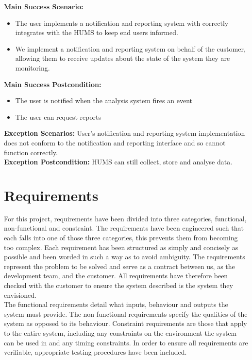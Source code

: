 \documentclass[10pt,a4paper]{article}
\begin{document}
\textbf{Main Success Scenario:}
\begin{itemize}
\item The user implements a notification and reporting system with correctly integrates with the HUMS to keep end users informed.
\item We implement a notification and reporting system on behalf of the customer, allowing them to receive updates about the state of the system they are monitoring.
\end{itemize}
\textbf{Main Success Postcondition:}
\begin{itemize}
\item The user is notified when the analysis system fires an event
\item The user can request reports
\end{itemize}
\textbf{Exception Scenarios:} User's notification and reporting system implementation does not conform to the notification and reporting interface and so cannot function correctly.\\
\textbf{Exception Postcondition:} HUMS can still collect, store and analyse data.

\section{Requirements}
For this project, requirements have been divided into three categories, functional, non-functional and constraint. The requirements have been engineered such that each falls into one of those three categories, this prevents them from becoming too complex. Each requirement has been structured as simply and concisely as possible and been worded in such a way as to avoid ambiguity. The requirements represent the problem to be solved and serve as a contract between us, as the development team, and the customer. All requirements have therefore been checked with the customer to ensure the system described is the system they envisioned.\\
The functional requirements detail what inputs, behaviour and outputs the system must provide. The non-functional requirements specify the qualities of the system as opposed to its behaviour. Constraint requirements are those that apply to the entire system, including any constraints on the environment the system can be used in and any timing constraints. In order to ensure all requirements are verifiable, appropriate testing procedures have been included.


\end{document}
